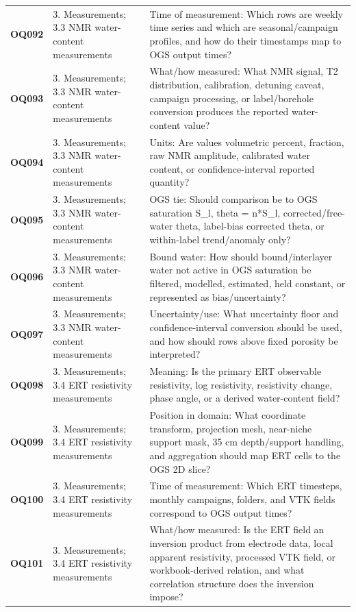 \begin{longtable}{@{}L{0.10\textwidth} L{0.23\textwidth} L{0.59\textwidth}@{}}
\addlinespace[0.16em]
\textbf{OQ092} & 3. Measurements; 3.3 NMR water-content measurements & Time of measurement: Which rows are weekly time series and which are seasonal/campaign profiles, and how do their timestamps map to OGS output times?\\
\addlinespace[0.16em]
\textbf{OQ093} & 3. Measurements; 3.3 NMR water-content measurements & What/how measured: What NMR signal, T2 distribution, calibration, detuning caveat, campaign processing, or label/borehole conversion produces the reported water-content value?\\
\addlinespace[0.16em]
\textbf{OQ094} & 3. Measurements; 3.3 NMR water-content measurements & Units: Are values volumetric percent, fraction, raw NMR amplitude, calibrated water content, or confidence-interval reported quantity?\\
\addlinespace[0.16em]
\textbf{OQ095} & 3. Measurements; 3.3 NMR water-content measurements & OGS tie: Should comparison be to OGS saturation S\_l, theta = n*S\_l, corrected/free-water theta, label-bias corrected theta, or within-label trend/anomaly only?\\
\addlinespace[0.16em]
\textbf{OQ096} & 3. Measurements; 3.3 NMR water-content measurements & Bound water: How should bound/interlayer water not active in OGS saturation be filtered, modelled, estimated, held constant, or represented as bias/uncertainty?\\
\addlinespace[0.16em]
\textbf{OQ097} & 3. Measurements; 3.3 NMR water-content measurements & Uncertainty/use: What uncertainty floor and confidence-interval conversion should be used, and how should rows above fixed porosity be interpreted?\\
\addlinespace[0.16em]
\textbf{OQ098} & 3. Measurements; 3.4 ERT resistivity measurements & Meaning: Is the primary ERT observable resistivity, log resistivity, resistivity change, phase angle, or a derived water-content field?\\
\addlinespace[0.16em]
\textbf{OQ099} & 3. Measurements; 3.4 ERT resistivity measurements & Position in domain: What coordinate transform, projection mesh, near-niche support mask, 35 cm depth/support handling, and aggregation should map ERT cells to the OGS 2D slice?\\
\addlinespace[0.16em]
\textbf{OQ100} & 3. Measurements; 3.4 ERT resistivity measurements & Time of measurement: Which ERT timesteps, monthly campaigns, folders, and VTK fields correspond to OGS output times?\\
\addlinespace[0.16em]
\textbf{OQ101} & 3. Measurements; 3.4 ERT resistivity measurements & What/how measured: Is the ERT field an inversion product from electrode data, local apparent resistivity, processed VTK field, or workbook-derived relation, and what correlation structure does the inversion impose?\\

\end{longtable}
